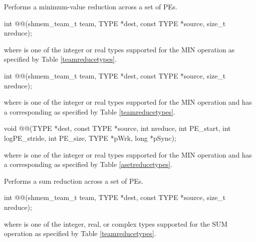 \begin{apidefinition}
\label{subsec:shmem_min_reduce}
Performs a minimum-value reduction across a set of \acp{PE}.\newline

\begin{C11synopsis}
int @@(shmem_team_t team, TYPE *dest, const TYPE *source, size_t nreduce);
\end{C11synopsis}
where \TYPE{} is one of the integer or real types supported for the MIN operation as specified by Table \ref{teamreducetypes}.

\begin{Csynopsis}
\end{Csynopsis}

\begin{CsynopsisCol}
int @@(shmem_team_t team, TYPE *dest, const TYPE *source, size_t nreduce);
\end{CsynopsisCol}
where \TYPE{} is one of the integer or real types supported for the MIN operation and has a corresponding \TYPENAME{} as specified by Table \ref{teamreducetypes}.

\begin{DeprecateBlock}
\begin{CsynopsisCol}
void @@(TYPE *dest, const TYPE *source, int nreduce, int PE_start, int logPE_stride, int PE_size, TYPE *pWrk, long *pSync);
\end{CsynopsisCol}
\end{DeprecateBlock}
where \TYPE{} is one of the integer or real types supported for the MIN operation and has a corresponding \TYPENAME{} as specified by Table \ref{asetreducetypes}.

\label{subsec:shmem_sum_reduce}
Performs a sum reduction across a set of \acp{PE}.\newline

\begin{C11synopsis}
int @@(shmem_team_t team, TYPE *dest, const TYPE *source, size_t nreduce);
\end{C11synopsis}
where \TYPE{} is one of the integer, real, or complex types supported for the SUM operation as specified by Table \ref{teamreducetypes}.

\begin{Csynopsis}
\end{Csynopsis}


\end{apidefinition}
